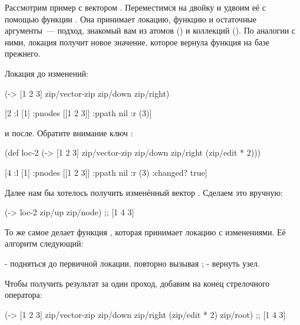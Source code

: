 Рассмотрим пример с вектором \code{[1 2 3]}. Переместимся на двойку и удвоим её с
помощью функции . Она принимает локацию, функцию и остаточные
аргументы~--- подход, знакомый вам из атомов () и коллекций (). По
аналогии с ними, локация получит новое значение, которое вернула функция на базе
прежнего.

Локация до изменений:

\begin{english}
  \begin{clojure}
(-> [1 2 3]
    zip/vector-zip
    zip/down
    zip/right)

[2 {:l [1] :pnodes [[1 2 3]] :ppath nil :r (3)}]
  \end{clojure}
\end{english}

и после. Обратите внимание ключ :

\begin{english}
  \begin{clojure}
(def loc-2
  (-> [1 2 3]
      zip/vector-zip
      zip/down
      zip/right
      (zip/edit * 2)))

[4 {:l [1] :pnodes [[1 2 3]] :ppath nil :r (3)
    :changed? true}]
  \end{clojure}
\end{english}

Далее нам бы хотелось получить изменённый вектор \code{[1 4 3]}. Сделаем это вручную:

\begin{english}
  \begin{clojure}
(-> loc-2
    zip/up
    zip/node)
;; [1 4 3]
  \end{clojure}
\end{english}

То же самое делает функция , которая принимает локацию с
изменениями. Её алгоритм следующий:

- подняться до первичной локации, повторно вызывая ;
- вернуть узел.

Чтобы получить результат за один проход, добавим  на конец стрелочного
оператора:

\begin{english}
  \begin{clojure}
(-> [1 2 3]
    zip/vector-zip
    zip/down
    zip/right
    (zip/edit * 2)
    zip/root)
;; [1 4 3]
  \end{clojure}
\end{english}


